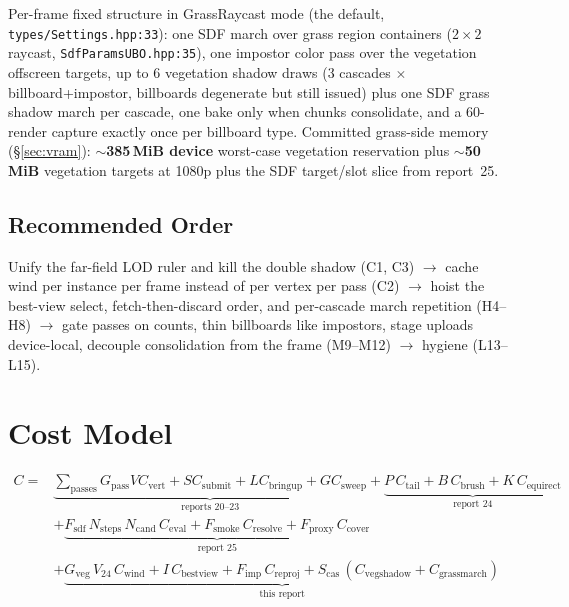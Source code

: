 \documentclass[11pt,a4paper]{article}
\begin{document}
Per-frame fixed structure in GrassRaycast mode (the default,
\texttt{types/Settings.hpp:33}): one SDF march over grass region containers
($2\times2$ raycast, \texttt{SdfParamsUBO.hpp:35}), one impostor color pass
over the vegetation offscreen targets, up to 6 vegetation shadow draws
(3 cascades $\times$ billboard+impostor, billboards degenerate but still
issued) plus one SDF grass shadow march per cascade, one bake only when
chunks consolidate, and a 60-render capture exactly once per billboard type.
Committed grass-side memory (\S\ref{sec:vram}): \textbf{$\sim$385\,MiB
device} worst-case vegetation reservation plus \textbf{$\sim$50\,MiB}
vegetation targets at 1080p plus the SDF target/slot slice from report~25.

\subsection{Recommended Order}

Unify the far-field LOD ruler and kill the double shadow (C1, C3)
$\rightarrow$ cache wind per instance per frame instead of per vertex per
pass (C2) $\rightarrow$ hoist the best-view select, fetch-then-discard
order, and per-cascade march repetition (H4--H8) $\rightarrow$ gate passes on
counts, thin billboards like impostors, stage uploads device-local, decouple
consolidation from the frame (M9--M12) $\rightarrow$ hygiene (L13--L15).

\section{Cost Model}

\begin{equation}
\begin{aligned}
C = &\underbrace{\sum_{\mathrm{passes}} G_{\mathrm{pass}} V C_{\mathrm{vert}} + S C_{\mathrm{submit}} + L C_{\mathrm{bringup}} + G C_{\mathrm{sweep}}}_{\text{reports 20--23}} + \underbrace{P\,C_{\mathrm{tail}} + B\,C_{\mathrm{brush}} + K\,C_{\mathrm{equirect}}}_{\text{report 24}} \\
&+ \underbrace{F_{\mathrm{sdf}}\,N_{\mathrm{steps}}\,N_{\mathrm{cand}}\,C_{\mathrm{eval}} + F_{\mathrm{smoke}}\,C_{\mathrm{resolve}} + F_{\mathrm{proxy}}\,C_{\mathrm{cover}}}_{\text{report 25}} \\
&+ \underbrace{G_{\mathrm{veg}}\,V_{24}\,C_{\mathrm{wind}} + I\,C_{\mathrm{bestview}} + F_{\mathrm{imp}}\,C_{\mathrm{reproj}} + S_{\mathrm{cas}}\,(C_{\mathrm{vegshadow}} + C_{\mathrm{grassmarch}})}_{\text{this report}}
\end{aligned}
\end{equation}
\end{document}
